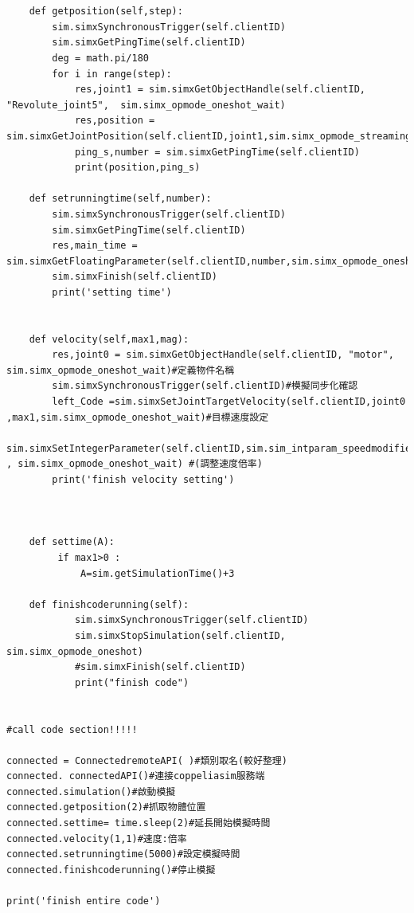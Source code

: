 \documentclass[14pt,a4paper]{report}  %
\begin{document}
{{{{\begin{itemize}
\begin{lstlisting}[caption=遠端API程式架構]
        
    
    def getposition(self,step):
        sim.simxSynchronousTrigger(self.clientID)
        sim.simxGetPingTime(self.clientID)
        deg = math.pi/180
        for i in range(step):
            res,joint1 = sim.simxGetObjectHandle(self.clientID, "Revolute_joint5",  sim.simx_opmode_oneshot_wait)
            res,position = sim.simxGetJointPosition(self.clientID,joint1,sim.simx_opmode_streaming)
            ping_s,number = sim.simxGetPingTime(self.clientID)
            print(position,ping_s)
   
    def setrunningtime(self,number):
        sim.simxSynchronousTrigger(self.clientID)
        sim.simxGetPingTime(self.clientID)
        res,main_time = sim.simxGetFloatingParameter(self.clientID,number,sim.simx_opmode_oneshot_wait)
        sim.simxFinish(self.clientID)
        print('setting time')
        
      
    def velocity(self,max1,mag):
        res,joint0 = sim.simxGetObjectHandle(self.clientID, "motor",  sim.simx_opmode_oneshot_wait)#定義物件名稱
        sim.simxSynchronousTrigger(self.clientID)#模擬同步化確認
        left_Code =sim.simxSetJointTargetVelocity(self.clientID,joint0 ,max1,sim.simx_opmode_oneshot_wait)#目標速度設定
        sim.simxSetIntegerParameter(self.clientID,sim.sim_intparam_speedmodifier,mag , sim.simx_opmode_oneshot_wait) #(調整速度倍率)
        print('finish velocity setting')
        
                 

    def settime(A):
         if max1>0 :
             A=sim.getSimulationTime()+3 

    def finishcoderunning(self): 
            sim.simxSynchronousTrigger(self.clientID)
            sim.simxStopSimulation(self.clientID, sim.simx_opmode_oneshot)
            #sim.simxFinish(self.clientID)
            print("finish code")
        
        
#call code section!!!!!

connected = ConnectedremoteAPI( )#類別取名(較好整理)
connected. connectedAPI()#連接coppeliasim服務端
connected.simulation()#啟動模擬
connected.getposition(2)#抓取物體位置
connected.settime= time.sleep(2)#延長開始模擬時間
connected.velocity(1,1)#速度:倍率
connected.setrunningtime(5000)#設定模擬時間
connected.finishcoderunning()#停止模擬

print('finish entire code')
		\end{lstlisting}
		\end{itemize}

}}}}
\end{document}
